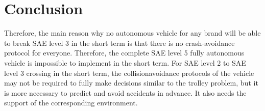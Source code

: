 \documentclass[9pt,twocolumn,twoside,lineno]{gsajnl}
\begin{document}
\section{Conclusion}
Therefore, the main reason why no autonomous vehicle for any brand will be able to break SAE level 3 in the short term is that there is no crash-avoidance protocol for everyone. Therefore, the complete SAE level 5 fully autonomous vehicle is impossible to implement in the short term. For SAE level 2 to SAE level 3 crossing in the short term, the collisionavoidance protocols of the vehicle may not be required to fully make decisions similar to the trolley problem, but it is more necessary to predict and avoid accidents in advance.    It also needs the support of the corresponding environment.\nocite{*}

\end{document}
